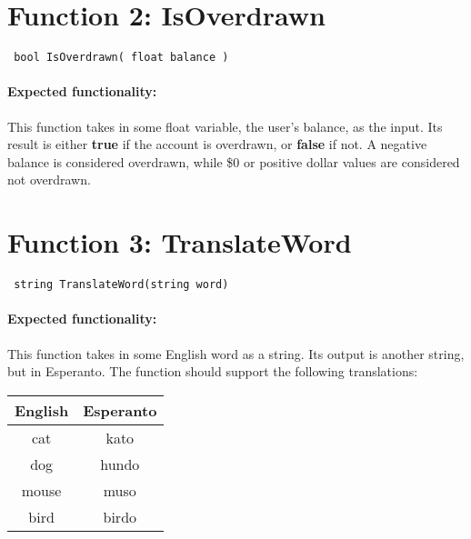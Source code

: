 \documentclass[a4paper,12pt]{book}
\begin{document}
    \hrulefill
    
    \section*{Function 2: IsOverdrawn}
    
        \begin{verbatim} bool IsOverdrawn( float balance ) \end{verbatim}
            
        \paragraph{Expected functionality:} This function takes in some
        float variable, the user's balance, as the input. Its result
        is either \textbf{true} if the account is overdrawn, or \textbf{false}
        if not. A negative balance is considered overdrawn, while \$0 or
        positive dollar values are considered not overdrawn.
    
    \hrulefill
    
    \section*{Function 3: TranslateWord}
    
        \begin{verbatim} string TranslateWord(string word) \end{verbatim}

        \paragraph{Expected functionality:} This function takes in some
        English word as a string. Its output is another string, but in
        Esperanto. The function should support the following translations:

        \begin{center}            
            \begin{tabular}{| c | c |}
                \hline{}
                \textbf{English} & \textbf{Esperanto} \\ \hline{}
                cat & kato \\ \hline
                dog & hundo \\ \hline
                mouse & muso \\ \hline
                bird & birdo \\ \hline
            \end{tabular}
        \end{center}
\end{document}
